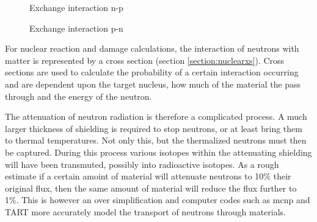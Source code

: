 \begin{figure}
\centering
\begin{minipage}{.30\textwidth}
\centering
{}
\caption{Exchange interaction n-p\cite{pionexchange}}
\label{fig:pppion}
\end{minipage}
\begin{minipage}{.30\textwidth}
\centering
{}
\caption{Exchange interaction p-n\cite{pionexchange}}
\label{fig:pnpion}
\end{minipage}
\end{figure}

For nuclear reaction and damage calculations, the interaction of neutrons with matter is represented by a cross section (section \ref{section:nuclearxs}).  Cross sections are used to calculate the probability of a certain interaction occurring and are dependent upon the target nucleus, how much of the material the pass through and the energy of the neutron.

The attenuation of neutron radiation is therefore a complicated process.  A much larger thickness of shielding is required to stop neutrons, or at least bring them to thermal temperatures.  Not only this, but the thermalized neutrons must then be captured.  During this process various isotopes within the attenuating shielding will have been transmuted, possibly into radioactive isotopes.  As a rough estimate if a certain amoint of material will attenuate neutrons to 10\% their original flux, then the same amount of material will reduce the flux further to 1\%.  This is however an over simplification and computer codes such as \acrfull{mcnp} and TART more accurately model the transport of neutrons through materials. 



